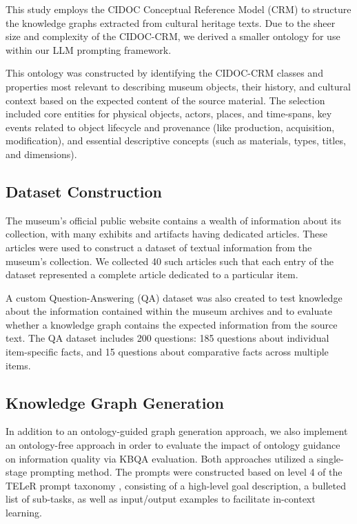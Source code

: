 \documentclass[a4, conference]{IEEEtran}
\begin{document}
This study employs the CIDOC Conceptual Reference Model (CRM) to structure the knowledge graphs extracted from cultural heritage texts. Due to the sheer size and complexity of the CIDOC-CRM, we derived a smaller ontology for use within our LLM prompting framework.

This ontology was constructed by identifying the CIDOC-CRM classes and properties most relevant to describing museum objects, their history, and cultural context based on the expected content of the source material. The selection included core entities for physical objects, actors, places, and time-spans, key events related to object lifecycle and provenance (like production, acquisition, modification), and essential descriptive concepts (such as materials, types, titles, and dimensions).

\subsection{Dataset Construction}

The museum's official public website contains a wealth of information about its collection, with many exhibits and artifacts having dedicated articles. These articles were used to construct a dataset of textual information from the museum's collection. We collected 40 such articles such that each entry of the dataset represented a complete article dedicated to a particular item.

A custom Question-Answering (QA) dataset was also created to test knowledge about the information contained within the museum archives and to evaluate whether a knowledge graph contains the expected information from the source text. The QA dataset includes 200 questions: 185 questions about individual item-specific facts, and 15 questions about comparative facts across multiple items.

\subsection{Knowledge Graph Generation}

In addition to an ontology-guided graph generation approach, we also implement an ontology-free approach in order to evaluate the impact of ontology guidance on information quality via KBQA evaluation. Both approaches utilized a single-stage prompting method. The prompts were constructed based on level 4 of the TELeR prompt taxonomy \cite{santu2023telergeneraltaxonomyllm}, consisting of a high-level goal description, a bulleted list of sub-tasks, as well as input/output examples to facilitate in-context learning.
\end{document}
